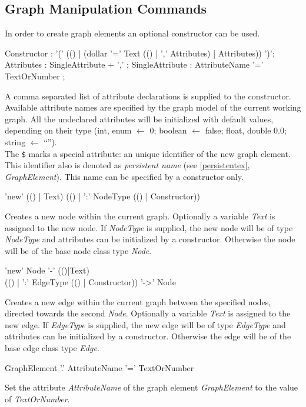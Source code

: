 \subsection{Graph Manipulation Commands}
\label{mani}
In order to create graph elements an optional constructor can be used. 
\begin{rail}
  Constructor : '(' (() | (dollar '=' Text (() | ',' Attributes) | Attributes)) ')';
  Attributes : SingleAttribute + ',' ;
  SingleAttribute : AttributeName '=' TextOrNumber ; 
\end{rail}
A comma separated list of attribute declarations is supplied to the constructor. Available attribute names are specified by the graph model of the current working graph. All the undeclared attributes will be initialized with default values, depending on their type (int, enum $\leftarrow$ 0; boolean $\leftarrow$ false; float, double 0.0; string $\leftarrow$ ``'').\\
The \texttt{\$} marks a special attribute: an unique identifier of the new graph element. This identifier also is denoted as \emph{persistent name} (see \ref{persistentex}, \emph{GraphElement}). This name can be specified by a constructor only.

\begin{rail}
  'new' (() | Text) (() | ':' NodeType (() | Constructor))
\end{rail}
Creates a new node within the current graph. Optionally a variable \emph{Text} is assigned to the new node. If \emph{NodeType} is supplied, the new node will be of type \emph{NodeType} and attributes can be initialized by a constructor. Otherwise the node will be of the base node class type \emph{Node}.

\begin{rail}
  'new' Node '-' (()|Text) \\ (() | ':' EdgeType (() | Constructor)) '->' Node
\end{rail}
Creates a new edge within the current graph between the specified nodes, directed towards the second \emph{Node}. Optionally a variable \emph{Text} is assigned to the new edge. If \emph{EdgeType} is supplied, the new edge will be of type \emph{EdgeType} and attributes can be initialized by a constructor. Otherwise the edge will be of the base edge class type \emph{Edge}.

\begin{rail}
  GraphElement '.' AttributeName '=' TextOrNumber
\end{rail}
Set the attribute \emph{AttributeName} of the graph element \emph{GraphElement} to the value of \emph{TextOrNumber}.

